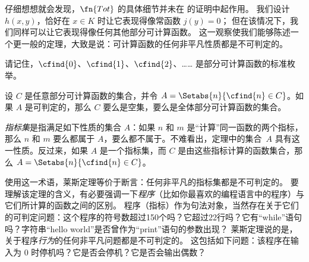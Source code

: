 \documentclass[../../../include/open-logic-section]{subfiles}
\begin{document}

仔细想想就会发现，$\fn{Tot}$ 的具体细节并未在  的证明中起作用。
我们设计 $h(x,y)$，恰好在 $x \in K$ 时让它表现得像常函数 $j(y) = 0$；
但在该情况下，我们同样可以让它表现得像任何其他部分可计算函数。
这一观察使我们能够陈述一个更一般的定理，大致是说：可计算函数的任何非平凡性质都是不可判定的。

请记住，$\cfind{0}$、$\cfind{1}$、$\cfind{2}$、…… 是部分可计算函数的标准枚举。

\begin{thm}[莱斯定理]
  设 $C$ 是任意部分可计算函数的集合，并令 $A =
  \Setabs{n}{\cfind{n} \in C}$。如果 $A$ 是可判定的，那么 $C$ 要么是空集，要么是全体部分可计算函数的集合。
\end{thm}

{\em 指标集}是指满足如下性质的集合 $A$：如果 $n$ 和 $m$ 是“计算”同一函数的两个指标，那么 $n$ 和 $m$ 要么都属于 $A$，要么都不属于。不难看出，定理中的集合~$A$ 具有这一性质。反过来，如果 $A$ 是一个指标集，而 $C$ 是由这些指标计算的函数集合，那么 $A = \Setabs{n}{\cfind{n} \in C}$。

\begin{explain}
使用这一术语，莱斯定理等价于断言：任何非平凡的指标集都是不可判定的。
要理解该定理的含义，有必要强调一下\emph{程序}（比如你最喜欢的编程语言中的程序）与它们所计算的函数之间的区别。
程序（指标）作为句法对象，当然存在关于它们的可判定问题：这个程序的符号数超过150个吗？它超过22行吗？它有“while”语句吗？字符串“hello world”是否曾作为“print”语句的参数出现？
莱斯定理说的是，关于程序\emph{行为}的任何非平凡问题都是不可判定的。
这包括如下问题：该程序在输入为 $0$ 时停机吗？它是否会停机？它是否会输出偶数？
\end{explain}
\end{document}
